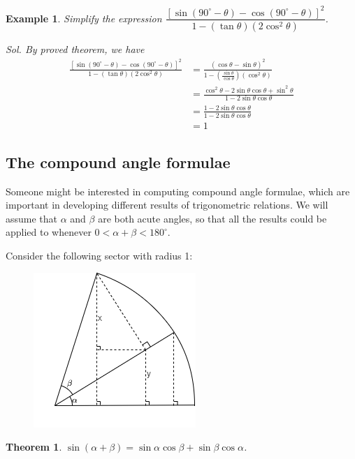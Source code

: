 \documentclass[12pt]{article}
\newtheorem*{theorem}{Theorem}
\newtheorem*{example}{Example}
\begin{document}
    \begin{example}
        Simplify the expression $\dfrac{[\sin(90^\circ - \theta) - \cos(90^\circ - \theta)]^2}{1-(\tan{\theta})(2\cos^2{\theta})}$.

        \textit{ Sol. }By proved theorem, we have \begin{align*}
            \frac{[\sin(90^\circ - \theta) - \cos(90^\circ - \theta)]^2}{1-(\tan{\theta})(2\cos^2{\theta})} &= \frac{(\cos{\theta}-\sin{\theta})^2}{1-(\frac{\sin{\theta}}{\cos{\theta}})(\cos^2{\theta})}\\
            &= \frac{\cos^2{\theta}-2\sin{\theta}\cos{\theta}+\sin^2{\theta}}{1-2\sin{\theta}\cos{\theta}}\\
            &= \frac{1-2\sin{\theta}\cos{\theta}}{1-2\sin{\theta}\cos{\theta}}\\
            &= 1
        \end{align*}
    \end{example}

    \subsection{The compound angle formulae}

    Someone might be interested in computing compound angle formulae, which are important in developing different results of trigonometric relations. We will assume that $\alpha$ and $\beta$ are both acute angles, so that all the results could be applied to whenever $0<\alpha+\beta<180^\circ$.

    Consider the following sector with radius 1:
    \begin{figure}[H]
        \centering
        \includegraphics[scale=0.8]{ab.png}
    \end{figure}

    \begin{theorem}
        $\sin(\alpha+\beta)=\sin{\alpha}\cos{\beta}+\sin{\beta}\cos{\alpha}$.
    \end{theorem}
\end{document}
